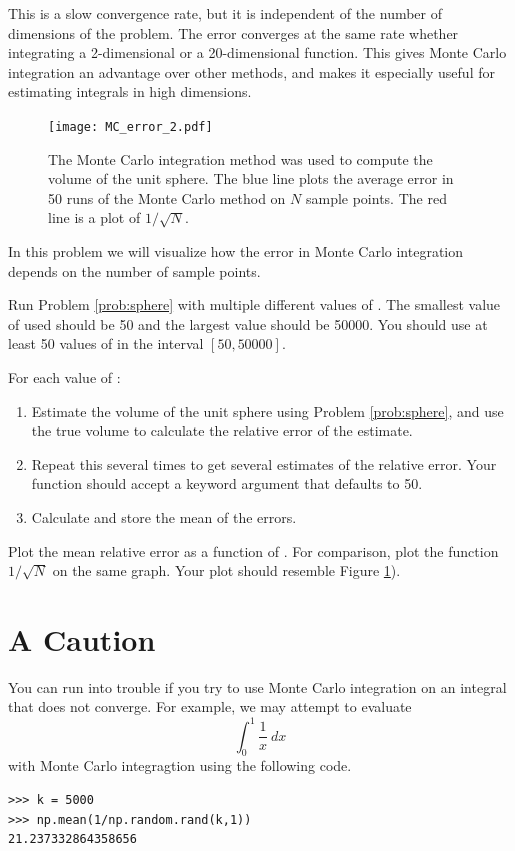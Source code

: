 This is a slow convergence rate, but it is independent of the number of dimensions of the problem. 
The error converges at the same rate whether integrating a 2-dimensional or a 20-dimensional function.
This gives Monte Carlo integration an advantage over other methods, and makes it especially useful for estimating integrals in high dimensions.


\begin{figure}
\texttt{[image: MC\_error\_2.pdf]}
\caption{The Monte Carlo integration method was used to compute the volume of the unit sphere. 
The blue line plots the average error in 50 runs of the Monte Carlo method on $N$ sample points.
The red line is a plot of $1/\sqrt{N}$. }
\label{fig:mc_error_2}
\end{figure}

\begin{problem}
In this problem we will visualize how the error in Monte Carlo integration depends on the number of sample points. 

Run Problem \ref{prob:sphere} with multiple different values of .
The smallest value of  used should be 50 and the largest value should be 50000. 
You should use at least 50 values of  in the interval ${[50,50000]}$.

For each value of : 
\begin{enumerate}
\item Estimate the volume of the unit sphere using Problem \ref{prob:sphere}, and use the true volume to calculate the relative error of the estimate.
\item Repeat this several times to get several estimates of the relative error. Your function should accept a keyword argument  that defaults to 50.
\item Calculate and store the mean of the errors.
\end{enumerate}

Plot the mean relative error as a function of . 
For comparison, plot the function $1/\sqrt{N}$ on the same graph.
Your plot should resemble Figure \ref{fig:mc_error_2}).

\end{problem}

\section*{A Caution}
You can run into trouble if you try to use Monte Carlo integration on an integral that does not converge.
For example, we may attempt to evaluate
\[
\int_0^1 \frac{1}{x}\:dx
\]
with Monte Carlo integragtion using the following code.
\begin{lstlisting}
>>> k = 5000
>>> np.mean(1/np.random.rand(k,1))
21.237332864358656
\end{lstlisting}

